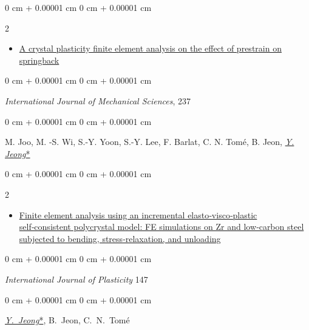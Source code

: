 \documentclass[10pt, letterpaper]{article}
\newenvironment{highlights}{
    \begin{itemize}[
        topsep=0.10 cm,
        parsep=0.10 cm,
        partopsep=0pt,
        itemsep=0pt,
        leftmargin=0 cm + 10pt
    ]
}{
    \end{itemize}
} %
\newenvironment{onecolentry}{
    \begin{adjustwidth}{
        0 cm + 0.00001 cm
    }{
        0 cm + 0.00001 cm
    }
}{
    \end{adjustwidth}
} %
\newenvironment{twocolentry}[2][]{
    \onecolentry
    \def\secondColumn{#2}
    \setcolumnwidth{\fill, 4.5 cm}
    \begin{paracol}{2}
}{
    \switchcolumn \raggedleft \secondColumn
    \end{paracol}
    \endonecolentry
} %
\begin{document}
\begin{samepage}
            \begin{twocolentry}{2023}
                \begin{highlights}
                \item\href{https://doi.org/10.1016/j.ijmecsci.2022.107796}{A crystal plasticity finite element analysis on the effect of prestrain on springback}
                \end{highlights}
            \end{twocolentry}
            \begin{onecolentry}
                {\it International Journal of Mechanical Sciences}, 237
              \end{onecolentry}
            \begin{onecolentry}
                M. Joo, M. -S. Wi, S.-Y. Yoon, S.-Y. Lee, F. Barlat, C. N. Tomé, B. Jeon, {\underline{\textit{Y. Jeong}*}}
             \end{onecolentry}
            \vspace{0.10 cm}

            \begin{twocolentry}{2021}
                \begin{highlights}
                \item\href{https://doi.org/10.1016/j.ijplas.2021.103110}{Finite element analysis using an incremental elasto‑visco‑plastic self‑consistent polycrystal model: FE simulations on Zr and low‑carbon steel subjected to bending, stress‑relaxation, and unloading}
                \end{highlights}
            \end{twocolentry}
            \begin{onecolentry}
                {\it International Journal of Plasticity} 147
            \end{onecolentry}
            \begin{onecolentry}
                \mbox{\underline{\textit{Y. Jeong}*}}, \mbox{B. Jeon}, \mbox{C. N. Tomé}
            \end{onecolentry}
            \vspace{0.10 cm}



\end{samepage}
\end{document}
